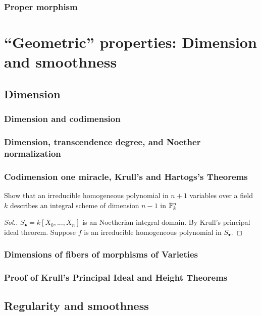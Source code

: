 \documentclass[11pt]{book} %
\begin{document}
\section{Proper morphism}
\part{``Geometric'' properties: Dimension and smoothness}
\chapter{Dimension}
\section{Dimension and codimension}
\section{Dimension, transcendence degree, and Noether normalization}
\section{Codimension one miracle, Krull's and Hartogs's Theorems}
\begin{exr}
Show that an irreducible homogeneous polynomial in $n+1$ variables over a field $k$ describes an integral scheme of dimension $n-1$ in $\mathbb P^n_k$ 
\end{exr}
\begin{proof}[Sol.]
$S_\bullet=k[X_0,...,X_n]$ is an Noetherian integral domain. By Krull's principal ideal theorem. Suppose $f$ is an irreducible homogeneous polynomial in $S_\bullet$.
\end{proof}
\section{Dimensions of fibers of morphisms of Varieties}
\section{Proof of Krull's Principal Ideal and Height Theorems}
\chapter{Regularity and smoothness}
\end{document}
